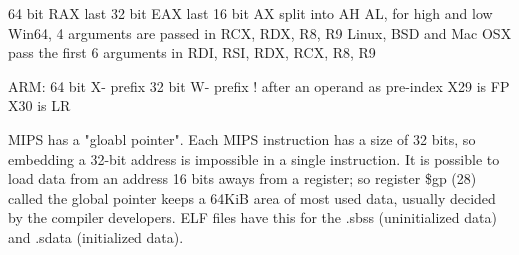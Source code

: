 \documentclass[11pt, a4paper, draft]{article}
\begin{document}
	64 bit RAX
	last 32 bit EAX
	last 16 bit AX
	split into AH AL, for high and low
	Win64, 4 arguments are passed in RCX, RDX, R8, R9
	Linux, BSD and Mac OSX pass the first 6 arguments in RDI, RSI, RDX, RCX, R8, R9
	
	ARM: 64 bit X- prefix
	32 bit W- prefix
	! after an operand as pre-index
	X29 is FP
	X30 is LR
	
	
	
	MIPS has a "gloabl pointer". Each MIPS instruction has a size of 32 bits, so embedding a 32-bit address is impossible in a single instruction. It is possible to load data from an address 16 bits aways from a register; so register \$gp (28) called the global pointer keeps a 64KiB area of most used data, usually decided by the compiler developers. ELF files have this for the .sbss (uninitialized data) and .sdata (initialized data).
	
\end{document}
